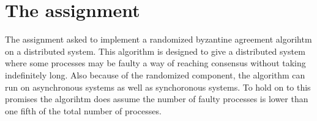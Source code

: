 \section{The assignment}

The assignment asked to implement a randomized byzantine agreement algorihtm on a distributed system.
This algorithm is designed to give a distributed system where some processes may be faulty a way of reaching consensus without taking indefinitely long.
Also because of the randomized component, the algorithm can run on asynchronous systems as well as synchoronous systems.
To hold on to this promises the algorihtm does assume the number of faulty processes is lower than one fifth of the total number of processes. 

